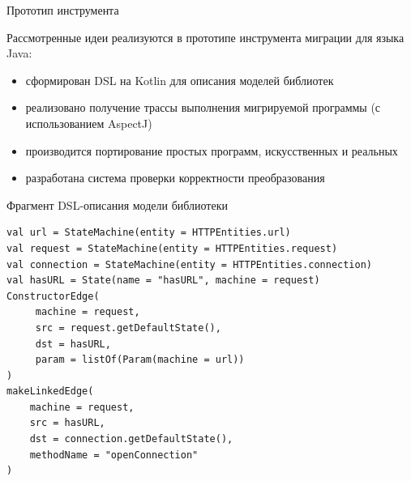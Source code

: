 \documentclass[12pt]{beamer}
\begin{document}

{
\begin{frame}{Прототип инструмента}
  \begin{mybox}[]
  Рассмотренные идеи реализуются в прототипе инструмента миграции для языка Java:
  \begin{itemize}
  	\item сформирован DSL на Kotlin для описания моделей библиотек
  	\item реализовано получение трассы выполнения мигрируемой программы (с использованием AspectJ)
  	\item производится портирование простых программ, искусственных и реальных
  	\item разработана система проверки корректности преобразования
  \end{itemize}
  \end{mybox}
\end{frame}
}

\begin{frame}[fragile]{Фрагмент DSL-описания модели библиотеки}
\begin{verbatim}
val url = StateMachine(entity = HTTPEntities.url)
val request = StateMachine(entity = HTTPEntities.request)
val connection = StateMachine(entity = HTTPEntities.connection)
val hasURL = State(name = "hasURL", machine = request)
ConstructorEdge(
     machine = request,
     src = request.getDefaultState(),
     dst = hasURL,
     param = listOf(Param(machine = url))
)
makeLinkedEdge(
    machine = request,
    src = hasURL,
    dst = connection.getDefaultState(),
    methodName = "openConnection"
)
\end{verbatim}
\end{frame}
\end{document}
